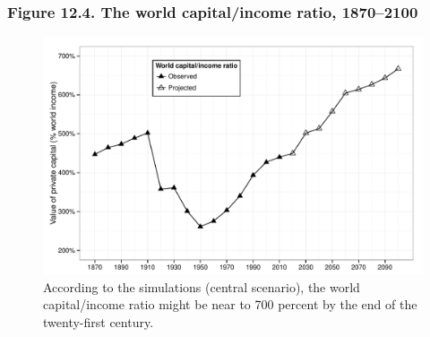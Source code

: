 \documentclass[t]{beamer}\usepackage[]{graphicx}\usepackage[]{color}
\newenvironment{knitrout}{}{} %
\begin{document}
\begin{frame}[label=Figure_12_4]
\frametitle{Figure 12.4. The world capital/income ratio, 1870--2100}
\begin{figure}[t]
\begin{minipage}[b]{\textwidth}
\centering
\begin{knitrout}\footnotesize
{}\color{fgcolor}

{\centering \includegraphics[width=1\linewidth]{figures/bw/Figure_12_4} 

}



\end{knitrout}
\caption{According to the simulations (central scenario), the world capital/income ratio might be near to 700 percent by the end of the twenty-first century.}
\end{minipage}
\end{figure}
\end{frame}
\end{document}
